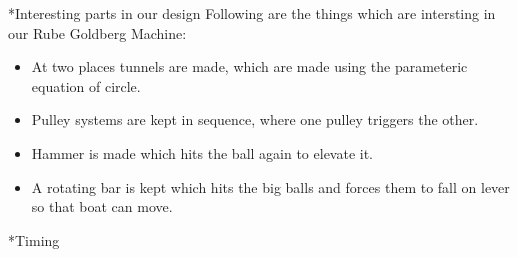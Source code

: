 \documentclass[11pt]{article}
\begin{document}
\begin{subsection}*{Interesting parts in our design}
Following are the things which are intersting in our Rube Goldberg Machine:
\begin{itemize}
\item At two places tunnels are made, which are made using the parameteric equation of circle.
\item Pulley systems are kept in sequence, where one pulley triggers the other.
\item Hammer is made which hits the ball again to elevate it.
\item A rotating bar is kept which hits the big balls and forces them to fall on lever so that boat can move. 
\end{itemize}

\end{subsection}
\pagebreak
\begin{subsection}*{Timing}
\end{subsection}
\end{document}
